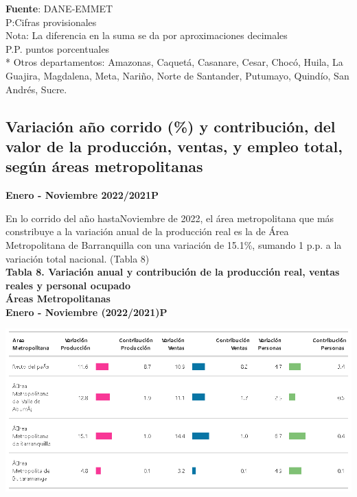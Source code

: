 \documentclass[
]{article}
\begin{document}
\textbf{Fuente}: DANE-EMMET\\
P:Cifras provisionales\\
Nota: La diferencia en la suma se da por aproximaciones decimales\\
P.P. puntos porcentuales\\
* Otros departamentos: Amazonas, Caquetá, Casanare, Cesar, Chocó, Huila,
La Guajira, Magdalena, Meta, Nariño, Norte de Santander, Putumayo,
Quindío, San Andrés, Sucre.\\

\hypertarget{variaciuxf3n-auxf1o-corrido-y-contribuciuxf3n-del-valor-de-la-producciuxf3n-ventas-y-empleo-total-seguxfan-uxe1reas-metropolitanas}{%
\subsection{Variación año corrido (\%) y contribución, del valor de la
producción, ventas, y empleo total, según áreas
metropolitanas}\label{variaciuxf3n-auxf1o-corrido-y-contribuciuxf3n-del-valor-de-la-producciuxf3n-ventas-y-empleo-total-seguxfan-uxe1reas-metropolitanas}}

\textbf{Enero - Noviembre 2022/2021P}

En lo corrido del año hastaNoviembre de 2022, el área metropolitana que
más constribuye a la variación anual de la producción real es la de Área
Metropolitana de Barranquilla con una variación de 15.1\%, sumando 1
p.p. a la variación total nacional. (Tabla 8)\\

\textbf{Tabla 8. Variación anual y contribución de la producción real,
ventas reales y personal ocupado}\\
\textbf{Áreas Metropolitanas}\\
\textbf{Enero - Noviembre (2022/2021)P}

\begin{center}\includegraphics[width=13.14in]{tabla8_1} \end{center}
\end{document}
